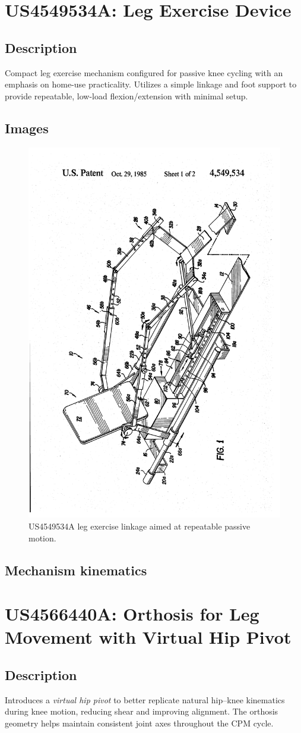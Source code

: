 \documentclass[11pt]{article}
\begin{document}
\section{US4549534A: Leg Exercise Device}
\subsection{Description}
Compact leg exercise mechanism configured for passive knee cycling with an emphasis on home-use practicality. Utilizes a simple linkage and foot support to provide repeatable, low-load flexion/extension with minimal setup.
\subsection{Images}
\begin{figure}[H]
  \centering
  \includegraphics[width=0.54\linewidth, angle=-90]{US4549534.png}
  \caption{US4549534A leg exercise linkage aimed at repeatable passive motion.}
  \label{fig:US4549534A}
\end{figure}

\subsection{Mechanism kinematics}

\section{US4566440A: Orthosis for Leg Movement with Virtual Hip Pivot}
\subsection{Description}
Introduces a \emph{virtual hip pivot} to better replicate natural hip–knee kinematics during knee motion, reducing shear and improving alignment. The orthosis geometry helps maintain consistent joint axes throughout the CPM cycle.
\end{document}
